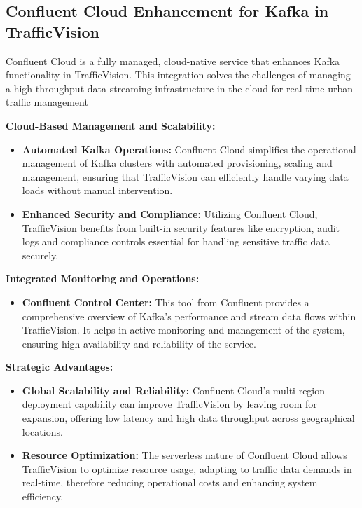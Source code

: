 \subsection{Confluent Cloud Enhancement for Kafka in TrafficVision}
Confluent\cite{confluent2024} Cloud is a fully managed, cloud-native service that enhances Kafka functionality in TrafficVision. This integration solves the challenges of managing a high throughput data streaming infrastructure in the cloud for real-time urban traffic management

\textbf{Cloud-Based Management and Scalability:}
\begin{itemize}
    \item \textbf{Automated Kafka Operations:} Confluent Cloud simplifies the operational management of Kafka clusters with automated provisioning, scaling and management, ensuring that TrafficVision can efficiently handle varying data loads without manual intervention.
    \item \textbf{Enhanced Security and Compliance:} Utilizing Confluent Cloud, TrafficVision benefits from built-in security features like encryption, audit logs and compliance controls essential for handling sensitive traffic data securely.
\end{itemize}

\textbf{Integrated Monitoring and Operations:}
\begin{itemize}
    \item \textbf{Confluent Control Center:} This tool from Confluent provides a comprehensive overview of Kafka's performance and stream data flows within TrafficVision. It helps in active monitoring and management of the system, ensuring high availability and reliability of the service.
\end{itemize}

\textbf{Strategic Advantages:}
\begin{itemize}
    \item \textbf{Global Scalability and Reliability:} Confluent Cloud's multi-region deployment capability can improve TrafficVision by leaving room for expansion, offering low latency and high data throughput across geographical locations.
    \item \textbf{Resource Optimization:} The serverless nature of Confluent Cloud allows TrafficVision to optimize resource usage, adapting to traffic data demands in real-time, therefore reducing operational costs and enhancing system efficiency.
\end{itemize}

